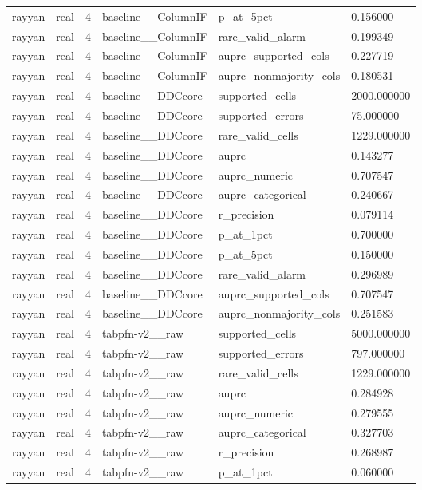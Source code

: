 \begin{tabular}{llllll}
rayyan & real & 4 & baseline\_\_ColumnIF & p\_at\_5pct & 0.156000 \\
rayyan & real & 4 & baseline\_\_ColumnIF & rare\_valid\_alarm & 0.199349 \\
rayyan & real & 4 & baseline\_\_ColumnIF & auprc\_supported\_cols & 0.227719 \\
rayyan & real & 4 & baseline\_\_ColumnIF & auprc\_nonmajority\_cols & 0.180531 \\
rayyan & real & 4 & baseline\_\_DDCcore & supported\_cells & 2000.000000 \\
rayyan & real & 4 & baseline\_\_DDCcore & supported\_errors & 75.000000 \\
rayyan & real & 4 & baseline\_\_DDCcore & rare\_valid\_cells & 1229.000000 \\
rayyan & real & 4 & baseline\_\_DDCcore & auprc & 0.143277 \\
rayyan & real & 4 & baseline\_\_DDCcore & auprc\_numeric & 0.707547 \\
rayyan & real & 4 & baseline\_\_DDCcore & auprc\_categorical & 0.240667 \\
rayyan & real & 4 & baseline\_\_DDCcore & r\_precision & 0.079114 \\
rayyan & real & 4 & baseline\_\_DDCcore & p\_at\_1pct & 0.700000 \\
rayyan & real & 4 & baseline\_\_DDCcore & p\_at\_5pct & 0.150000 \\
rayyan & real & 4 & baseline\_\_DDCcore & rare\_valid\_alarm & 0.296989 \\
rayyan & real & 4 & baseline\_\_DDCcore & auprc\_supported\_cols & 0.707547 \\
rayyan & real & 4 & baseline\_\_DDCcore & auprc\_nonmajority\_cols & 0.251583 \\
rayyan & real & 4 & tabpfn-v2\_\_raw & supported\_cells & 5000.000000 \\
rayyan & real & 4 & tabpfn-v2\_\_raw & supported\_errors & 797.000000 \\
rayyan & real & 4 & tabpfn-v2\_\_raw & rare\_valid\_cells & 1229.000000 \\
rayyan & real & 4 & tabpfn-v2\_\_raw & auprc & 0.284928 \\
rayyan & real & 4 & tabpfn-v2\_\_raw & auprc\_numeric & 0.279555 \\
rayyan & real & 4 & tabpfn-v2\_\_raw & auprc\_categorical & 0.327703 \\
rayyan & real & 4 & tabpfn-v2\_\_raw & r\_precision & 0.268987 \\
rayyan & real & 4 & tabpfn-v2\_\_raw & p\_at\_1pct & 0.060000 \\

\end{tabular}
